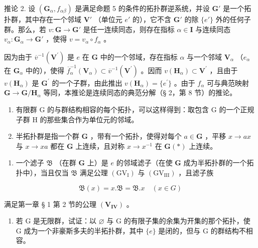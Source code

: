 推论 2. 设 \((\mathbf{G}_{\alpha}, f_{\alpha \beta})\) 是满足命题 5 的条件的拓扑群逆系统，并设 \(\mathbf{G}'\) 是一个拓扑群，其中存在一个邻域 \(\mathbf{V}'\) （单位元 \(e'\) 的），它不含 \(\mathbf{G}'\) 的除 \(\{e'\}\) 外的任何子群。那么，若 \(v: \mathbf{G} \to \mathbf{G}'\) 是任一连续同态，则存在指标 \(\alpha \in \mathbf{I}\) 与连续同态 \(v_{\alpha}: \mathbf{G}_{\alpha} \to \mathbf{G}'\) ，使得 \(v = v_{\alpha} \circ f_{\alpha}\) 。

因为由于 \(\overline{v}^{-1}(\mathbf{V}^{\prime})\) 是 \(e\) 在 \(\mathbf{G}\) 中的一个邻域，存在指标 \(\alpha\) 与一个邻域 \(\mathbf{V}_{\alpha}\) （\(e_{\alpha}\) 在 \(\mathbf{G}_{\alpha}\) 中的），使得 \(\overline{f}_{\alpha}^{-1}(\mathbf{V}_{\alpha}) \subset \overline{v}^{-1}(\mathbf{V}^{\prime})\) 。因而 \(v(\mathbf{H}_{\alpha}) \subset \mathbf{V}^{\prime}\) ，且由于 \(v(\mathbf{H}_{\alpha})\) 是 \(\mathbf{G}^{\prime}\) 的一个子群，由此推出 \(v(\mathbf{H}_{\alpha}) = \{e^{\prime}\}\) 。由于 \(f_{\alpha}\) 可与典范映射 \(\mathbf{G} \to \mathbf{G}/\mathbf{H}_{\alpha}\) 等同，本推论是连续同态的典范分解（§ 2，第 8 节）的推论。

\BourbakiExercises
\BourbakiExerciseGroup

\begin{enumerate}
\def\labelenumi{\arabic{enumi})}
\item
  有限群 G 的与群结构相容的每个拓扑，可以这样得到：取包含 G 的一个正规子群 H 的那些集合作为单位元的邻域。
\item
半拓扑群是指一个群 \(\mathbf{G}\) ，带有一个拓扑，使得对每个 \(a \in \mathbf{G}\) ，平移 \(x \to ax\) 与 \(x \to xa\) 都在 \(\mathbf{G}\) 上连续，且对称 \(x \to x^{-1}\) 在 \(\mathbf{G}(*)\) 上连续。
\end{enumerate}

\begin{enumerate}
\def\labelenumi{\alph{enumi})}
\tightlist
\item
  一个滤子 \(\mathfrak{B}\) （在群 \(\mathbf{G}\) 上）是 \(e\) 的邻域滤子（在使 \(\mathbf{G}\) 成为半拓扑群的一个拓扑中），当且仅当 \(\mathfrak{B}\) 满足公理 \((\mathrm{GV}_{\mathrm{I}})\) 与 \((\mathrm{GV}_{\mathrm{III}})\) ，且滤子族
\end{enumerate}

\[
\mathfrak {B} (x) = x. \mathfrak {B} = \mathfrak {B}. x \quad (x \in G)
\]

满足第一章 § 1 第 2 节的公理 \((\mathbf{V}_{\mathbf{IV}})\) 。

\begin{enumerate}
\def\labelenumi{\alph{enumi})}
\setcounter{enumi}{1}
\tightlist
\item
  若 G 是无限群，试证：以 \(\varnothing\) 与 G 的有限子集的余集为开集的那个拓扑，使 G 成为一个非豪斯多夫的半拓扑群，其中 \(\{e\}\) 是闭的，但与 G 的群结构不相容。
\end{enumerate}

